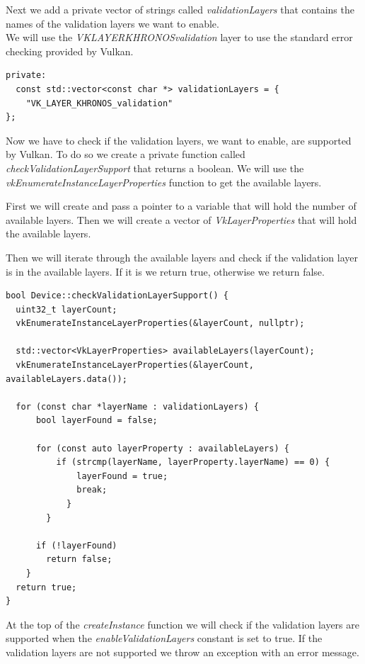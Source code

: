 \documentclass[12pt]{report} \usepackage{preamble}
\begin{document}
Next we add a private vector of strings called \textit{validationLayers} that contains the names of the
validation layers we want to enable. \\
We will use the \textit{VK\textunderscore LAYER\textunderscore KHRONOS\textunderscore validation}
layer to use the standard error checking provided by Vulkan.

\begin{lstlisting}[Language=C++]
private:
  const std::vector<const char *> validationLayers = {
    "VK_LAYER_KHRONOS_validation"
};
\end{lstlisting}

Now we have to check if the validation layers, we want to enable, are supported by Vulkan.
To do so we create a private function called \textit{checkValidationLayerSupport} that returns a boolean.
We will use the \textit{vkEnumerateInstanceLayerProperties} function to get the available layers.

First we will create and pass a pointer to a variable that will hold the number of available layers.
Then we will create a vector of \textit{VkLayerProperties} that will hold the available layers.

Then we will iterate through the available layers and check if the validation layer is in the available layers.
If it is we return true, otherwise we return false.

\begin{lstlisting}[Language=C++]
bool Device::checkValidationLayerSupport() {
  uint32_t layerCount;
  vkEnumerateInstanceLayerProperties(&layerCount, nullptr);

  std::vector<VkLayerProperties> availableLayers(layerCount);
  vkEnumerateInstanceLayerProperties(&layerCount, availableLayers.data());

  for (const char *layerName : validationLayers) {
      bool layerFound = false;

      for (const auto layerProperty : availableLayers) {
          if (strcmp(layerName, layerProperty.layerName) == 0) {
              layerFound = true;
              break;
            }
        }

      if (!layerFound)
        return false;
    }
  return true;
}
\end{lstlisting}

At the top of the \textit{createInstance} function we will check if the validation layers are supported
when the \textit{enableValidationLayers} constant is set to true. If the validation layers are not
supported we throw an exception with an error message.
\end{document}
